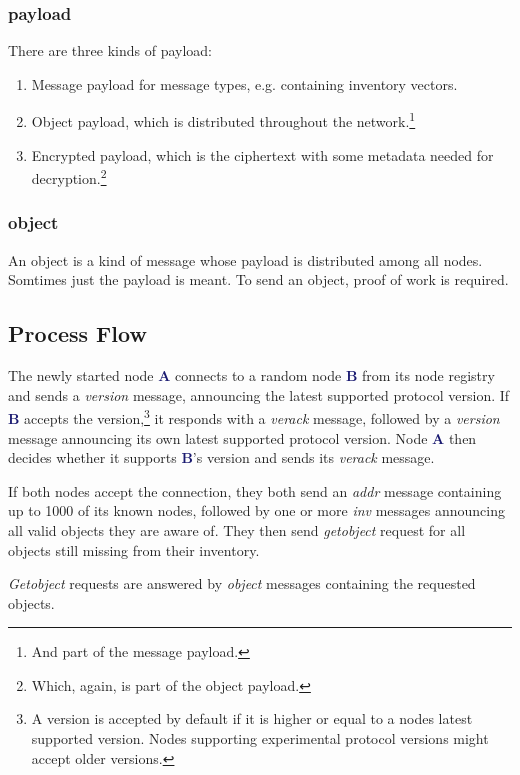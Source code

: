 \documentclass{bfh}
\newcommand{\msg}[1]{\textit{\textcolor{RedOrange}{#1}}}
\newcommand{\node}[1]{\textbf{\textcolor{MidnightBlue}{#1}}}
\begin{document}
  \subsubsection{payload}
  There are three kinds of payload:
  \begin{enumerate}
  \item Message payload for message types, e.g. containing inventory vectors.
  \item Object payload, which is distributed throughout the network.\footnote{And part of the message payload.}
  \item Encrypted payload, which is the ciphertext with some metadata needed for decryption.\footnote{Which, again, is part of the object payload.}
  \end{enumerate}

  \subsubsection{object}
  An object is a kind of message whose payload is distributed among all nodes. Somtimes just the payload is meant. To send an object, proof of work is required.

  \subsection{Process Flow}

  The newly started node \node{A} connects to a random node \node{B} from its node registry and sends a \msg{version} message, announcing the latest supported protocol version. If \node{B} accepts the version,\footnote{A version is accepted by default if it is higher or equal to a nodes latest supported version. Nodes supporting experimental protocol versions might accept older versions.} it responds with a \msg{verack} message, followed by a \msg{version} message announcing its own latest supported protocol version. Node \node{A} then decides whether it supports \node{B}'s version and sends its \msg{verack} message.

  If both nodes accept the connection, they both send an \msg{addr} message containing up to 1000 of its known nodes, followed by one or more \msg{inv} messages announcing all valid objects they are aware of. They then send \msg{getobject} request for all objects still missing from their inventory.

  \msg{Getobject} requests are answered by \msg{object} messages containing the requested objects.
\end{document}

